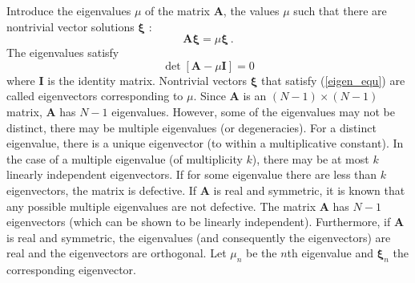 \documentclass[12pt,a4paper]{article}
\renewcommand{\vec}[1]{\boldsymbol{#1}}
\begin{document}
Introduce the eigenvalues $\mu$ of the matrix $\vec{A}$, the values $\mu$ such that there are nontrivial vector solutions $\vec{\xi}$ :
\begin{equation}
\vec{A} \vec{\xi} = \mu \vec{\xi} ~.
\label{eigen_equ}
\end{equation}
The eigenvalues satisfy
\begin{equation}
\det [\vec{A} -\mu \vec{I}] = 0
\end{equation}
where $\vec{I}$ is the identity matrix. Nontrivial vectors $\vec{\xi}$ that satisfy (\ref{eigen_equ}) are called eigenvectors corresponding to $\mu$. Since $\vec{A}$ is an $(N-1)\times (N-1)$ matrix, $\vec{A}$ has $N-1$ eigenvalues. However, some of  the eigenvalues may not be distinct, there may be multiple eigenvalues (or degeneracies). For a distinct eigenvalue, there is a unique eigenvector (to within a multiplicative constant). In the case of a multiple eigenvalue (of multiplicity $k$), there may be at most $k$ linearly independent eigenvectors. If for some eigenvalue there are less than $k$ eigenvectors, the matrix is defective. If $\vec{A}$ is real and symmetric, it is known that any possible multiple eigenvalues are not defective. The matrix $\vec{A}$ has $N-1$ eigenvectors (which can be shown to be linearly independent). Furthermore, if $\vec{A}$ is real and symmetric, the eigenvalues (and consequently the eigenvectors) are real and the eigenvectors  are orthogonal. Let $\mu_n$ be the $n$th eigenvalue and $\vec{\xi}_n$ the corresponding eigenvector.
\end{document}
